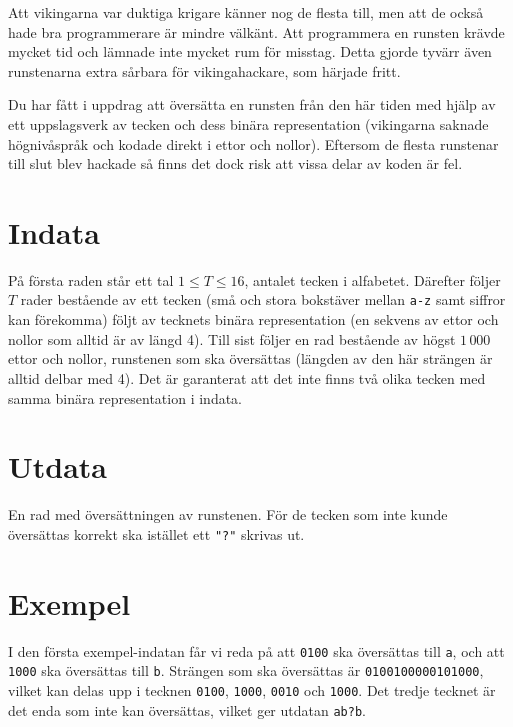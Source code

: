Att vikingarna var duktiga krigare känner nog de flesta till, men att de också hade bra programmerare är mindre välkänt. Att programmera en runsten krävde mycket tid och lämnade inte mycket rum för misstag. Detta gjorde tyvärr även runstenarna extra sårbara för vikingahackare, som härjade fritt.

Du har fått i uppdrag att översätta en runsten från den här tiden med hjälp av ett uppslagsverk av tecken och dess binära representation (vikingarna saknade högnivåspråk och kodade direkt i ettor och nollor). Eftersom de flesta runstenar till slut blev hackade så finns det dock risk att vissa delar av koden är fel.

\section*{Indata}
På första raden står ett tal $1 \le T \le 16$, antalet tecken i alfabetet. Därefter följer $T$ rader bestående av ett tecken (små och stora bokstäver mellan \texttt{a-z} samt siffror kan förekomma) följt av tecknets binära representation (en sekvens av ettor och nollor som alltid är av längd 4). Till sist följer en rad bestående av högst $1\,000$ ettor och nollor, runstenen som ska översättas (längden av den här strängen är alltid delbar med 4). Det är garanterat att det inte finns två olika tecken med samma binära representation i indata.

\section*{Utdata}
En rad med översättningen av runstenen. För de tecken som inte kunde översättas korrekt ska istället ett \texttt{"?"} skrivas ut.

\section*{Exempel}
I den första exempel-indatan får vi reda på att \texttt{0100} ska översättas till \texttt{a}, och att \texttt{1000} ska översättas till \texttt{b}. Strängen som ska översättas är \texttt{0100100000101000}, vilket kan delas upp i tecknen \texttt{0100}, \texttt{1000}, \texttt{0010} och \texttt{1000}. Det tredje tecknet är det enda som inte kan översättas, vilket ger utdatan \texttt{ab?b}.
